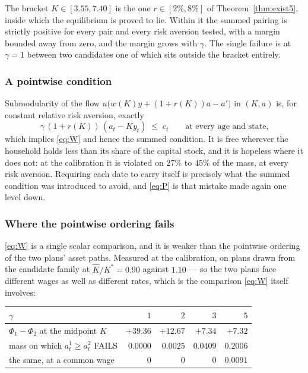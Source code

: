 The bracket $K\in[3.55,7.40]$ is the one $r\in[2\%,8\%]$ of Theorem~\ref{thm:exist5}, inside which
the equilibrium is proved to lie. Within it the summed pairing is strictly positive for every pair
and every risk aversion tested, with a margin bounded away from zero, and the margin grows with
$\gamma$. The single failure is at $\gamma=1$ between two candidates one of which sits outside the
bracket entirely.

\subsubsection*{A pointwise condition}

Submodularity of the flow $u\bigl(w(K)y+(1+r(K))a-a'\bigr)$ in $(K,a)$ is, for constant relative
risk aversion, exactly
\begin{equation}\label{eq:P}
  \gamma\,(1+r(K))\,(a_t-Ky_t)\;\le\;c_t \qquad\text{at every age and state,}
  \tag{P}
\end{equation}
which implies \eqref{eq:W} and hence the summed condition. It is free wherever the household holds
less than its share of the capital stock, and it is hopeless where it does not: at the calibration
it is violated on $27\%$ to $45\%$ of the mass, at every risk aversion. Requiring each date to
carry itself is precisely what the summed condition was introduced to avoid, and \eqref{eq:P} is
that mistake made again one level down.

\subsubsection*{Where the pointwise ordering fails}

\eqref{eq:W} is a single scalar comparison, and it is weaker than the pointwise ordering of the two
plans' asset paths. Measured at the calibration, on plans drawn from the candidate family at
$\hat K/K^*=0.90$ against $1.10$ --- so the two plans face different wages as well as different
rates, which is the comparison \eqref{eq:W} itself involves:

\begin{center}
\begin{tabular}{lrrrr}
\toprule
$\gamma$ & $1$ & $2$ & $3$ & $5$\\
\midrule
$\Phi_1-\Phi_2$ at the midpoint $K$ & $+39.36$ & $+12.67$ & $+7.34$ & $+7.32$\\
mass on which $a^1_t\ge a^2_t$ FAILS & $0.0000$ & $0.0025$ & $0.0409$ & $0.2006$\\
the same, at a common wage & $0$ & $0$ & $0$ & $0.0091$\\
\bottomrule
\end{tabular}
\end{center}

